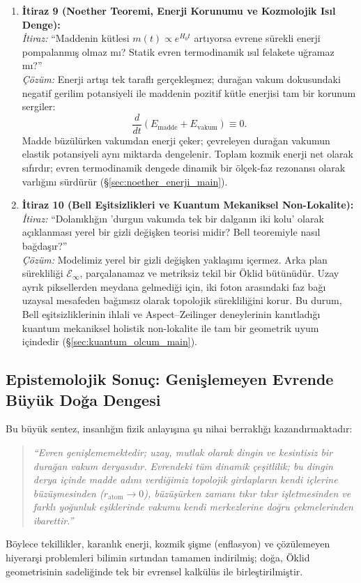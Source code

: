 \begin{enumerate}
    \item \textbf{İtiraz 9 (Noether Teoremi, Enerji Korunumu ve Kozmolojik Isıl Denge):} \\
          \textit{İtiraz:} ``Maddenin kütlesi $m(t) \propto e^{H_0 t}$ artıyorsa evrene sürekli enerji pompalanmış olmaz mı? Statik evren termodinamik ısıl felakete uğramaz mı?'' \\
          \textit{Çözüm:} Enerji artışı tek taraflı gerçekleşmez; durağan vakum dokusundaki negatif gerilim potansiyeli ile maddenin pozitif kütle enerjisi tam bir korunum sergiler:
          \begin{equation}
              \frac{d}{dt} \left( E_{\mathrm{madde}} + E_{\mathrm{vakum}} \right) \equiv 0.
          \end{equation}
          Madde büzülürken vakumdan enerji çeker; çevreleyen durağan vakumun elastik potansiyeli aynı miktarda dengelenir. Toplam kozmik enerji net olarak sıfırdır; evren termodinamik dengede dinamik bir ölçek-faz rezonansı olarak varlığını sürdürür (\S\ref{sec:noether_enerji_main}).

    \item \textbf{İtiraz 10 (Bell Eşitsizlikleri ve Kuantum Mekaniksel Non-Lokalite):} \\
          \textit{İtiraz:} ``Dolanıklığın 'durgun vakumda tek bir dalganın iki kolu' olarak açıklanması yerel bir gizli değişken teorisi midir? Bell teoremiyle nasıl bağdaşır?'' \\
          \textit{Çözüm:} Modelimiz yerel bir gizli değişken yaklaşımı içermez. Arka plan sürekliliği $\mathcal{E}_\infty$, parçalanamaz ve metriksiz tekil bir Öklid bütünüdür. Uzay ayrık piksellerden meydana gelmediği için, iki foton arasındaki faz bağı uzaysal mesafeden bağımsız olarak topolojik sürekliliğini korur. Bu durum, Bell eşitsizliklerinin ihlali ve Aspect--Zeilinger deneylerinin kanıtladığı kuantum mekaniksel holistik non-lokalite ile tam bir geometrik uyum içindedir (\S\ref{sec:kuantum_olcum_main}).
\end{enumerate}

\subsection{Epistemolojik Sonuç: Genişlemeyen Evrende Büyük Doğa Dengesi}
\label{sec:epistemolojik_sonuc}

Bu büyük sentez, insanlığın fizik anlayışına şu nihai berraklığı kazandırmaktadır:
\begin{quote}
    \small
    \textit{``Evren genişlememektedir; uzay, mutlak olarak dingin ve kesintisiz bir durağan vakum deryasıdır. Evrendeki tüm dinamik çeşitlilik; bu dingin derya içinde madde adını verdiğimiz topolojik girdapların kendi içlerine büzüşmesinden ($r_{\mathrm{atom}} \to 0$), büzüşürken zamanı tıkır tıkır işletmesinden ve farklı yoğunluk eşiklerinde vakumu kendi merkezlerine doğru çekmelerinden ibarettir.''}
\end{quote}
Böylece tekillikler, karanlık enerji, kozmik şişme (enflasyon) ve çözülemeyen hiyerarşi problemleri bilimin sırtından tamamen indirilmiş; doğa, Öklid geometrisinin sadeliğinde tek bir evrensel kalkülüs ile birleştirilmiştir.
